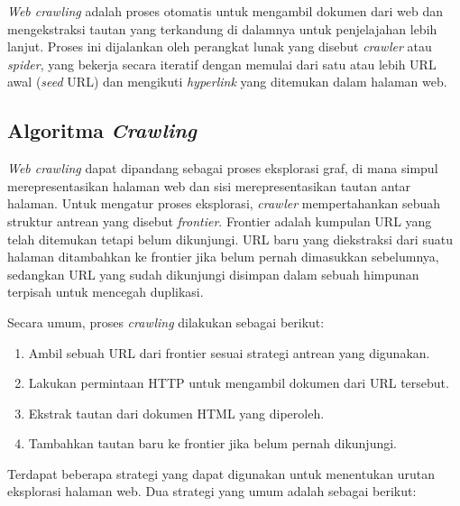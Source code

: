 \textit{Web crawling} adalah proses otomatis untuk mengambil dokumen dari web dan mengekstraksi tautan yang terkandung di dalamnya untuk penjelajahan lebih lanjut. Proses ini dijalankan oleh perangkat lunak yang disebut \textit{crawler} atau \textit{spider}, yang bekerja secara iteratif dengan memulai dari satu atau lebih URL awal (\textit{seed} URL) dan mengikuti \textit{hyperlink} yang ditemukan dalam halaman web.

\subsection{Algoritma \textit{Crawling}}
\label{subsec:0204-algoritme-crawling}

\textit{Web crawling} dapat dipandang sebagai proses eksplorasi graf, di mana simpul merepresentasikan halaman web dan sisi merepresentasikan tautan antar halaman. Untuk mengatur proses eksplorasi, \textit{crawler} mempertahankan sebuah struktur antrean yang disebut \textit{frontier}. Frontier adalah kumpulan URL yang telah ditemukan tetapi belum dikunjungi. URL baru yang diekstraksi dari suatu halaman ditambahkan ke frontier jika belum pernah dimasukkan sebelumnya, sedangkan URL yang sudah dikunjungi disimpan dalam sebuah himpunan terpisah untuk mencegah duplikasi.

Secara umum, proses \textit{crawling} dilakukan sebagai berikut:
\begin{enumerate}
  \item Ambil sebuah URL dari frontier sesuai strategi antrean yang digunakan.
  \item Lakukan permintaan HTTP untuk mengambil dokumen dari URL tersebut.
  \item Ekstrak tautan dari dokumen HTML yang diperoleh.
  \item Tambahkan tautan baru ke frontier jika belum pernah dikunjungi.
\end{enumerate}

Terdapat beberapa strategi yang dapat digunakan untuk menentukan urutan eksplorasi halaman web. Dua strategi yang umum adalah sebagai berikut:

